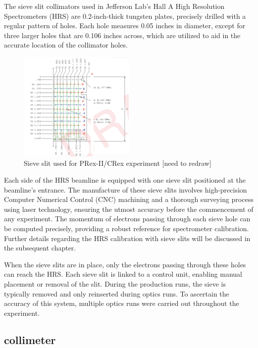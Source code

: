 The sieve slit collimators used in Jefferson Lab's Hall A High Resolution Spectrometers (HRS) are 0.2-inch-thick tungsten plates, precisely drilled with a regular pattern of holes. Each hole measures 0.05 inches in diameter, except for three larger holes that are 0.106 inches across, which are utilized to aid in the accurate location of the collimator holes.
\begin{figure}[!htbp]
    \centering
    \includegraphics[width=0.5\textwidth]{images/chap3/sive_slit.png}
    \caption{Sieve slit used for PRex-II/CRex experiment [need to redraw]}
    \label{fig:enter-label}
\end{figure}
Each side of the HRS beamline is equipped with one sieve slit positioned at the beamline's entrance. The manufacture of these sieve slits involves high-precision Computer Numerical Control (CNC) machining and a thorough surveying process using laser technology, ensuring the utmost accuracy before the commencement of any experiment. The momentum of electrons passing through each sieve hole can be computed precisely, providing a robust reference for spectrometer calibration. Further details regarding the HRS calibration with sieve slits will be discussed in the subsequent chapter.

When the sieve slits are in place, only the electrons passing through these holes can reach the HRS. Each sieve slit is linked to a control unit, enabling manual placement or removal of the slit. During the production runs, the sieve is typically removed and only reinserted during optics runs. To ascertain the accuracy of this system, multiple optics runs were carried out throughout the experiment. 




\subsection{collimeter}

